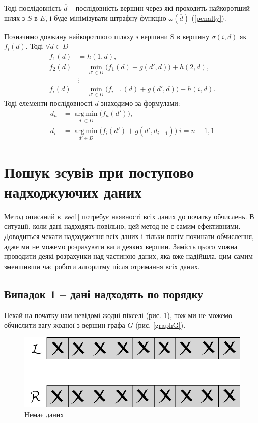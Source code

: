 \documentclass{ConfFTI}
\DeclareMathOperator*{\argmin}{arg\,min}
\begin{document}
Тоді послідовність $\overline{d}$ -- послідовність вершин через які проходить найкоротший шлях з $S$ в $E$, і буде мінімізувати штрафну функцію $ \omega(\overline{d}) $ (\ref{penalty}).

Позначимо довжину найкоротшого шляху з вершини S в вершину $ \sigma(i, d) $ як $ f_i (d) $. Тоді $ \forall d \in D $ 
\begin{align*}
f_1 (d) &= h(1, d), \\
f_2 (d) &=  \min\limits_{d' \in D}\Big( f_1(d) + g(d', d) \Big) + h(2, d), \\
&\vdots \\
f_i (d) &= \min\limits_{d' \in D}\Big( f_{i-1}(d) + g(d', d) \Big) + h(i, d).
\end{align*}
Тоді елементи послідовності $\overline{d}$ знаходимо за формулами:
\begin{align*}
d_n &= \argmin\limits_{d' \in D}{\big( f_n(d') \big)}, \\
d_i &= \argmin\limits_{d' \in D}{\big( f_{i}(d') + g(d',d_{i+1})\big) \; i = \overline{n-1, 1}}
\end{align*}
\section{Пошук зсувів при поступово надходжуючих даних}

Метод описаний в \ref{sec1} потребує наявності всіх даних до початку обчислень. В ситуації, коли дані надходять повільно, цей метод не є самим ефективними. Доводиться чекати надходження всіх даних і тільки потім починати обчислення, адже ми не можемо розрахувати ваги деяких вершин.
Замість цього можна проводити деякі розрахунки над частиною даних, яка вже надійшла, цим самим зменшивши час роботи алгоритму після отримання всіх даних.

\subsection{Випадок 1 -- дані надходять по порядку} \label{2.1}

Нехай на початку нам невідомі жодні пікселі (рис. \ref{2.1nodata}), тож ми не можемо обчислити вагу жодної з вершин графа $G$ (рис. \ref{graphG}).  
\begin{figure}[h!]
	\centering
	\includegraphics[scale = 0.5]{allclosed2.pdf}
	\caption{Немає даних}
	\label{2.1nodata}
\end{figure}
\end{document}
